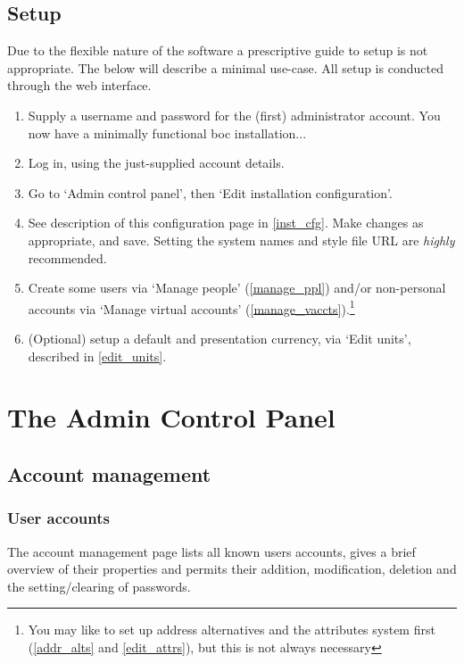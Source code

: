 \documentclass{report}
\begin{document}
\section{Setup}

Due to the flexible nature of the software a prescriptive guide to setup is not appropriate.  The below will describe a minimal use-case.  All setup is conducted through the web interface.

\begin{enumerate}
\item Supply a username and password for the (first) administrator account.  You now have a minimally functional boc installation...
\item Log in, using the just-supplied account details.
\item Go to `Admin control panel', then `Edit installation configuration'.
\item See description of this configuration page in \autoref{inst_cfg}.  Make changes as appropriate, and save.  Setting the system names and style file URL are \emph{highly} recommended.
\item Create some users via `Manage people' (\autoref{manage_ppl}) and/or non-personal accounts via `Manage virtual accounts' (\autoref{manage_vaccts}).\footnote{You may like to set up address alternatives and the attributes system first (\autoref{addr_alts} and \autoref{edit_attrs}), but this is not always necessary}
\item (Optional) setup a default and presentation currency, via `Edit units', described in \autoref{edit_units}.
\end{enumerate}

\chapter{The Admin Control Panel}

\section{Account management}

\subsection{User accounts}\label{manage_ppl}

The account management page lists all known users accounts, gives a brief overview of their properties and permits their addition, modification, deletion and the setting/clearing of passwords.
\end{document}
